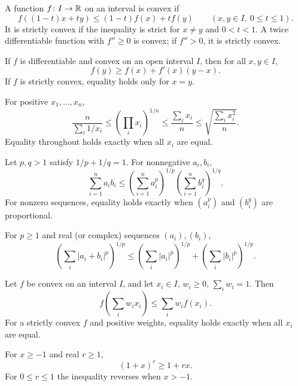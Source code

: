 \begin{definition}
A function $f\colon I\to\mathbb{R}$ on an interval is convex if
\[
 f((1-t)x+ty)\le (1-t)f(x)+tf(y)
 \qquad(x,y\in I,\ 0\le t\le1).
\]
It is strictly convex if the inequality is strict for $x\ne y$ and $0<t<1$. A twice differentiable function with $f''\ge0$ is convex; if $f''>0$, it is strictly convex.
\end{definition}

\begin{theorem}
If $f$ is differentiable and convex on an open interval $I$, then for all $x, y\in I$,
\[
 f(y)\ge f(x)+f'(x)(y-x).
\]
If $f$ is strictly convex, equality holds only for $x=y$.
\end{theorem}

\begin{theorem}
For positive $x_1, \dots, x_n$,
\[
 \frac{n}{\sum_i1/x_i}
 \le\left(\prod_i x_i\right)^{1/n}
 \le\frac{\sum_i x_i}{n}
 \le\sqrt{\frac{\sum_i x_i^2}{n}}.
\]
Equality throughout holds exactly when all $x_i$ are equal.
\end{theorem}

\begin{theorem}
Let $p, q>1$ satisfy $1/p+1/q=1$. For nonnegative $a_i, b_i$,
\[
 \sum_{i=1}^n a_ib_i\le
 \left(\sum_{i=1}^n a_i^p\right)^{1/p}
 \left(\sum_{i=1}^n b_i^q\right)^{1/q}.
\]
For nonzero sequences, equality holds exactly when $(a_i^p)$ and $(b_i^q)$ are proportional.
\end{theorem}

\begin{theorem}
For $p\ge1$ and real (or complex) sequences $(a_i), (b_i)$,
\[
 \left(\sum_i|a_i+b_i|^p\right)^{1/p}
 \le\left(\sum_i|a_i|^p\right)^{1/p}
 +\left(\sum_i|b_i|^p\right)^{1/p}.
\]
\end{theorem}

\begin{theorem}
Let $f$ be convex on an interval $I$, and let $x_i\in I$, $w_i\ge0$, $\sum_iw_i=1$. Then
\[
 f\!\left(\sum_iw_ix_i\right)\le\sum_iw_if(x_i).
\]
For a strictly convex $f$ and positive weights, equality holds exactly when all $x_i$ are equal.
\end{theorem}

\begin{theorem}
For $x\ge-1$ and real $r\ge1$,
\[
 (1+x)^r\ge1+rx.
\]
For $0\le r\le1$ the inequality reverses when $x>-1$.
\end{theorem}

